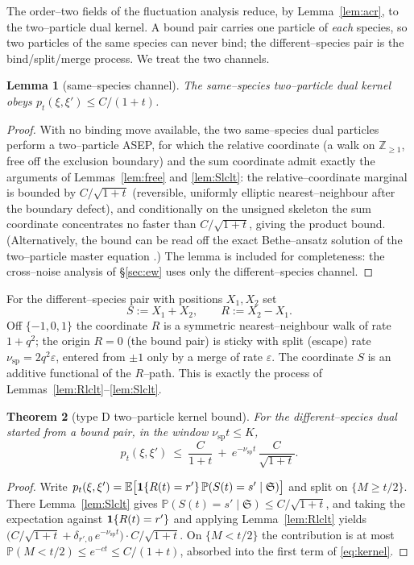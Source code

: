 \documentclass[11pt]{article}
\theoremstyle{plain}
\newtheorem{theorem}{Theorem}[section]
\newtheorem{lemma}[theorem]{Lemma}
\theoremstyle{definition}
\theoremstyle{remark}
\newcommand{\Z}{\mathbb{Z}}\newcommand{\R}{\mathbb{R}}\newcommand{\N}{\mathbb{N}}
\newcommand{\E}{\mathbb{E}}\newcommand{\PP}{\mathbb{P}}\newcommand{\dd}{\,\mathrm{d}}
\newcommand{\eps}{\varepsilon}\newcommand{\Exp}{\mathrm{Exp}}
\begin{document}
The order--two fields of the fluctuation analysis reduce, by Lemma~\ref{lem:acr}, to
the two--particle dual kernel. A bound pair carries one particle of \emph{each}
species, so two particles of the same species can never bind; the different--species
pair is the bind/split/merge process. We treat the two channels.

\begin{lemma}[same--species channel]\label{lem:asep}
The same--species two--particle dual kernel obeys $p_t(\xi,\xi')\le C/(1+t)$.
\end{lemma}
\begin{proof}
With no binding move available, the two same--species dual particles perform a
two--particle ASEP, for which the relative coordinate (a walk on $\Z_{\ge1}$,
free off the exclusion boundary) and the sum coordinate admit exactly the
arguments of Lemmas~\ref{lem:free} and \ref{lem:Slclt}: the relative--coordinate
marginal is bounded by $C/\sqrt{1+t}$ (reversible, uniformly elliptic
nearest--neighbour after the boundary defect), and conditionally on the unsigned
skeleton the sum coordinate concentrates no faster than $C/\sqrt{1+t}$, giving the
product bound. (Alternatively, the bound can be read off the exact Bethe--ansatz
solution of the two--particle master equation \cite{Schutz}.) The lemma is included
for completeness: the cross--noise analysis of \S\ref{sec:ew} uses only the
different--species channel.
\end{proof}

For the different--species pair with positions $X_1,X_2$ set
\begin{equation}\label{eq:SR}
  S:=X_1+X_2,\qquad R:=X_2-X_1.
\end{equation}
Off $\{-1,0,1\}$ the coordinate $R$ is a symmetric nearest--neighbour walk of rate
$1+q^2$; the origin $R=0$ (the bound pair) is sticky with split (escape) rate
$\nu_{\mathrm{sp}}=2q^2\eps$, entered from $\pm1$ only by a merge of rate $\eps$. The
coordinate $S$ is an additive functional of the $R$--path. This is exactly the process
of Lemmas~\ref{lem:Rlclt}--\ref{lem:Slclt}.

\begin{theorem}[type D two--particle kernel bound]\label{thm:kernel}
For the different--species dual started from a bound pair, in the window
$\nu_{\mathrm{sp}}t\le K$,
\begin{equation}\label{eq:kernel}
  p_t(\xi,\xi')\ \le\ \frac{C}{1+t}\ +\ e^{-\nu_{\mathrm{sp}}t}\,\frac{C}{\sqrt{1+t}}.
\end{equation}
\end{theorem}
\begin{proof}
Write $p_t(\xi,\xi')=\E\big[\bone\{R(t)=r'\}\,\PP(S(t)=s'\mid\mathfrak S)\big]$ and
split on $\{M\ge t/2\}$. There Lemma~\ref{lem:Slclt} gives
$\PP(S(t)=s'\mid\mathfrak S)\le C/\sqrt{1+t}$, and taking the expectation against
$\mathbf 1\{R(t)=r'\}$ and applying Lemma~\ref{lem:Rlclt} yields
$\big(C/\sqrt{1+t}+\delta_{r',0}\,e^{-\nu_{\mathrm{sp}}t}\big)\cdot C/\sqrt{1+t}$. On
$\{M<t/2\}$ the contribution is at most $\PP(M<t/2)\le e^{-ct}\le C/(1+t)$, absorbed
into the first term of \eqref{eq:kernel}.
\end{proof}
\end{document}

